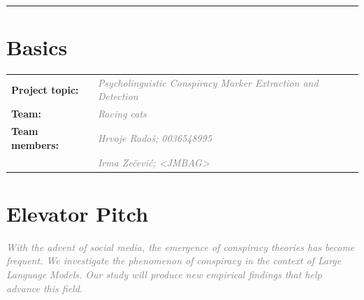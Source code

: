 \documentclass[11pt, a4paper]{article}
\newif\ifinstructions
\newcommand{\explain}[1]{%
  \ifinstructions
    \par\vspace{2pt}%
    {\small\color{exgray} #1}%
    \par\vspace{2pt}%
  \fi
}
\newcommand{\guideline}[1]{%
  \ifinstructions
    \par\vspace{3pt}%
    {\small\color{exgray}\textit{#1}}%
    \par\vspace{1pt}%
  \fi
}
\newcommand{\example}[1]{%
  \ifinstructions
    \par\vspace{1pt}%
    {\small\color{exblue} #1}%
    \par\vspace{4pt}%
  \fi
}
\newcommand{\fillhere}[1]{%
  \par\vspace{2pt}%
  \textit{\textcolor{gray}{#1}}%
  \par\vspace{2pt}%
}
\begin{document}
{\noindent\textcolor{rulegray}{\rule{\linewidth}{0.4pt}}
\vspace{4pt}
\fi

\section{Basics}

\begin{tabular}{@{}ll}
  \textbf{Project topic:} & \fillhere{Psycholinguistic Conspiracy Marker Extraction and Detection}   \\[6pt]
  \textbf{Team:} & \fillhere{Racing cats} \\[2pt]
  \textbf{Team members:}  & \fillhere{Hrvoje Radoš; 0036548995} \\[2pt]
                          & \fillhere{Irma Zečević; <JMBAG>} \\
\end{tabular}
\section{Elevator Pitch}

\explain{Describe your project in 2--3 sentences as if you had 30 seconds to explain it to someone unfamiliar with the topic. Name the \textbf{problem}, the \textbf{approach}, and the expected \textbf{contribution} --- in that order. Write this section \textbf{last}, even though it appears first. It is the abstract of your abstract.}

\guideline{(1) What problem does your work address, and why does it matter?}
\example{``Despite the rapid growth of NLP benchmarks, most evaluate models in English only, leaving multilingual generalization largely unmeasured.''}

\guideline{(2) What is your approach?}
\example{``We investigate whether cross-lingual transfer from pre-trained multilingual models can close this gap on low-resource Slavic languages.''}

\guideline{(3) What will your work contribute?}
\example{``Our study produces a new benchmark and a set of empirical findings that will inform future multilingual model design.''}

\fillhere{
With the advent of social media, the emergence of conspiracy theories has become frequent.
We investigate the phenomenon of conspiracy in the context of Large Language Models.
Our study will produce new empirical findings that help advance this field.}

}
\end{document}
